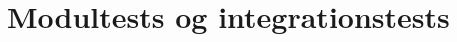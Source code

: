 






\tableofcontents

\newpage

\newpage

\newpage

\newpage

\newpage


\newpage
\section{Modultests og integrationstests}



\newpage

\newpage
 





